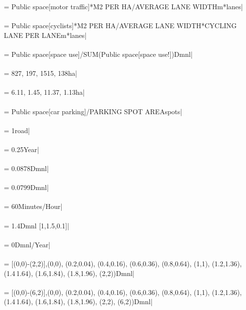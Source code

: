  = {\small Public space[motor traffic]*M2 PER HA/AVERAGE LANE WIDTHm*lanes|} \\ \\ 
 = {\small Public space[cyclists]*M2 PER HA/AVERAGE LANE WIDTH*CYCLING LANE PER LANEm*lanes|} \\ \\ 
 = {\small Public space[space use]/SUM(Public space[space use!])Dmnl|} \\ \\ 
 = {\small 827, 197, 1515, 138ha|} \\ \\ 
 = {\small 6.11, 1.45, 11.37, 1.13ha|} \\ \\ 
 = {\small Public space[car parking]/PARKING SPOT AREAspots|} \\ \\ 
 = {\small 1road|} \\ \\ 
 = {\small 0.25Year|} \\ \\ 
 = {\small 0.0878Dmnl|} \\ \\ 
 = {\small 0.0799Dmnl|} \\ \\ 
 = {\small 60Minutes/Hour|} \\ \\ 
 = {\small 1.4Dmnl [1,1.5,0.1]|} \\ \\ 
 = {\small 0Dmnl/Year|} \\ \\ 
 = {\small [(0,0)-(2,2)],(0,0), (0.2,0.04), (0.4,0.16), (0.6,0.36), (0.8,0.64), (1,1), (1.2,1.36), (1.4\,1.64), (1.6,1.84), (1.8,1.96), (2,2))Dmnl|} \\ \\ 
 = {\small [(0,0)-(6,2)],(0,0), (0.2,0.04), (0.4,0.16), (0.6,0.36), (0.8,0.64), (1,1), (1.2,1.36), (1.4\,1.64), (1.6,1.84), (1.8,1.96), (2,2), (6,2))Dmnl|} \\ \\ 
